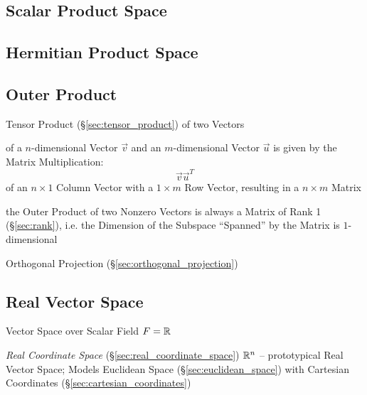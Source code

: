 \subsection{Scalar Product Space}\label{sec:scalar_product_space}

\subsection{Hermitian Product Space}\label{sec:hermitian_product_space}

\subsection{Outer Product}\label{sec:outer_product}

Tensor Product (\S\ref{sec:tensor_product}) of two Vectors

of a $n$-dimensional Vector $\vec{v}$ and an $m$-dimensional Vector $\vec{u}$ is
given by the Matrix Multiplication:
\[
  \vec{v}\vec{u}^T
\]
of an $n \times 1$ Column Vector with a $1 \times m$ Row Vector, resulting in a
$n \times m$ Matrix

the Outer Product of two Nonzero Vectors is always a Matrix of Rank 1
(\S\ref{sec:rank}), i.e. the Dimension of the Subspace ``Spanned'' by the Matrix
is $1$-dimensional

\fist Orthogonal Projection (\S\ref{sec:orthogonal_projection})



\subsection{Real Vector Space}\label{sec:real_vector_space}

Vector Space over Scalar Field $F = \mathbb{R}$

\fist \emph{Real Coordinate Space} (\S\ref{sec:real_coordinate_space})
$\mathbb{R}^n$ -- prototypical Real Vector Space; Models Euclidean Space
(\S\ref{sec:euclidean_space}) with Cartesian Coordinates
(\S\ref{sec:cartesian_coordinates})

